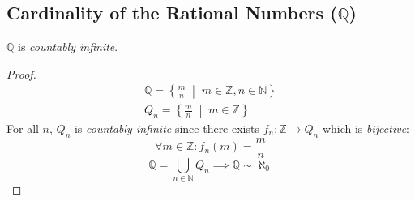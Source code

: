 \documentclass[00_complete]{subfiles}
\begin{document}
\subsection{Cardinality of the Rational Numbers \texorpdfstring{($\mathbb{Q}$)}{}}
\begin{claim}
    $\mathbb{Q}$ is \emph{countably infinite}.
\end{claim}
\begin{proof}
    \begin{gather*}
    \mathbb{Q}=\left\{\frac{m}{n} \;\middle|\; m \in \mathbb{Z}, n \in
    \mathbb{N}\right\} \\
    Q_n=\left\{\frac{m}{n} \;\middle|\; m \in \mathbb{Z}\right\}
    \end{gather*}
    For all $n$, $Q_n$ is \emph{countably infinite} since there exists $f_n:
    \mathbb{Z} \to Q_n$ which is \emph{bijective}:
    $$\forall m \in \mathbb{Z}: f_n(m)=\frac{m}{n}$$
    $$\mathbb{Q}=\bigcup_{n \in \mathbb{N}}Q_n \implies \mathbb{Q} \sim
    \aleph_0$$
\end{proof}
\end{document}

